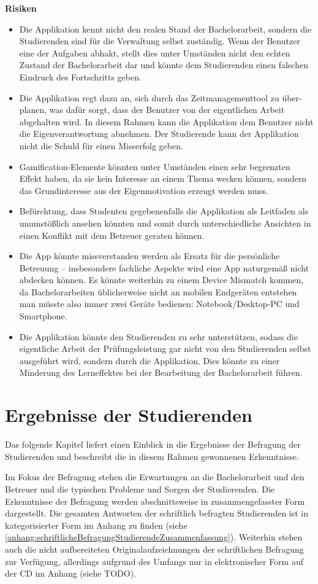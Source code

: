 \documentclass[bibliography=totoc,listof=totoc,BCOR=5mm,DIV=12,oneside]{scrbook}
\begin{document}
\newpage
\par \bigskip \textbf{Risiken}
\begin{itemize}
\item Die Applikation kennt nicht den realen Stand der Bachelorarbeit, sondern die Studierenden sind für die Verwaltung selbst zuständig. Wenn der Benutzer eine der Aufgaben abhakt, stellt dies unter Umständen nicht den echten Zustand der Bachelorarbeit dar und könnte dem Studierenden einen falschen Eindruck des Fortschritts geben.
\item Die Applikation regt dazu an, sich durch das Zeitmanagementtool zu über-planen, was dafür sorgt, dass der Benutzer von der eigentlichen Arbeit abgehalten wird. In diesem Rahmen kann die Applikation dem Benutzer nicht die Eigenverantwortung abnehmen. Der Studierende kann der Applikation nicht die Schuld für einen Misserfolg geben.
\item Gamification-Elemente könnten unter Umständen einen sehr begrenzten Effekt haben, da sie kein Interesse an einem Thema wecken können, sondern das Grundinteresse aus der Eigenmotivation erzeugt werden muss.
\item Befürchtung, dass Studenten gegebenenfalls die Applikation als Leitfaden als unumstößlich ansehen könnten und somit durch unterschiedliche Ansichten in einen Konflikt mit dem Betreuer geraten können.
\item Die App könnte missverstanden werden als Ersatz für die persönliche Betreuung – insbesondere fachliche Aspekte wird eine App naturgemäß nicht abdecken können. Es könnte weiterhin zu einem \grqq Device Mismatch\grqq{} kommen, da Bachelorarbeiten üblicherweise nicht an mobilen Endgeräten entstehen man müsste also immer zwei Geräte bedienen: Notebook/Desktop-PC und Smartphone.
\item Die Applikation könnte den Studierenden zu sehr unterstützen, sodass die eigentliche Arbeit der Prüfungsleistung gar nicht von den Studierenden selbst ausgeführt wird, sondern durch die Applikation. Dies könnte zu einer Minderung des Lerneffektes bei der Bearbeitung der Bachelorarbeit führen.

\end{itemize}

\newpage
\section{Ergebnisse der Studierenden}
\par Das folgende Kapitel liefert einen Einblick in die Ergebnisse der Befragung der Studierenden und beschreibt die in diesem Rahmen gewonnenen Erkenntnisse.
\par Im Fokus der Befragung stehen die Erwartungen an die Bachelorarbeit und den Betreuer und die typischen Probleme und Sorgen der Studierenden. Die Erkenntnisse der Befragung werden abschnittsweise in zusammengefasster Form dargestellt. Die gesamten Antworten der schriftlich befragten Studierenden ist in kategorisierter Form im Anhang zu finden (siehe \ref{anhang:schriftlicheBefragungStudierendeZusammenfassung}). Weiterhin stehen auch die nicht aufbereiteten Originalaufzeichnungen der schriftlichen Befragung zur Verfügung, allerdings aufgrund des Umfangs nur in elektronischer Form auf der CD im Anhang (siehe TODO).
\end{document}
